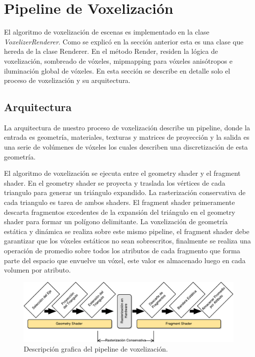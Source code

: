 \section{Pipeline de Voxelización} %
\label{sec:pipeline_de_voxelizacion}
El algoritmo de voxelización de escenas es implementado en la clase \emph{VoxelizerRenderer}. Como se explicó en la sección anterior esta es una clase que hereda de la clase Renderer. En el método Render, residen la lógica de voxelización, sombreado de vóxeles, mipmapping para vóxeles anisótropos e iluminación global de vóxeles. En esta sección se describe en detalle solo el proceso de voxelización y su arquitectura.
\subsection{Arquitectura}

La arquitectura de nuestro proceso de voxelización describe un pipeline, donde la entrada es geometría, materiales, texturas y matrices de proyección y la salida es una serie de volúmenes de vóxeles los cuales describen una discretización de esta geometría.

El algoritmo de voxelización se ejecuta entre el geometry shader y el fragment shader. En el geometry shader se proyecta y traslada los vértices de cada triangulo para generar un triángulo expandido. La rasterización conservativa de cada triangulo es tarea de ambos shaders. El fragment shader primeramente descarta fragmentos excedentes de la expansión del triángulo en el geometry shader para formar un polígono delimitante. La voxelización de geometría estática y dinámica se realiza sobre este mismo pipeline, el fragment shader debe garantizar que los vóxeles estáticos no sean sobrescritos, finalmente se realiza una operación de promedio sobre todos los atributos de cada fragmento que forma parte del espacio que envuelve un vóxel, este valor es almacenado luego en cada volumen por atributo.
\begin{figure}[H]
    \centering
    \includegraphics[width=\linewidth]{media/voxel_pipeline_cropped.pdf}
    \caption{Descripción grafica del pipeline de voxelización.}
\end{figure}


